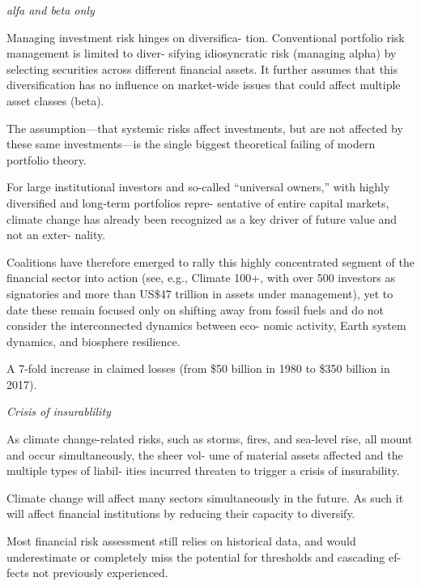\documentclass[
]{book}
\begin{document}
\emph{alfa and beta only}

Managing investment risk hinges on diversifica-
tion. Conventional portfolio risk management is limited to diver-
sifying idiosyncratic risk (managing alpha) by selecting securities
across different financial assets. It further assumes that this
diversification has no influence on market-wide issues that could
affect multiple asset classes (beta).

The assumption---that systemic risks affect
investments, but are not affected by these same investments---is
the single biggest theoretical failing of modern portfolio theory.

For large institutional investors and so-called ``universal
owners,'' with highly diversified and long-term portfolios repre-
sentative of entire capital markets, climate change has already
been recognized as a key driver of future value and not an exter-
nality.

Coalitions have therefore emerged to rally this highly
concentrated segment of the financial sector into action (see,
e.g., Climate 100+, with over 500 investors as signatories and
more than US\$47 trillion in assets under management), yet to
date these remain focused only on shifting away from fossil fuels
and do not consider the interconnected dynamics between eco-
nomic activity, Earth system dynamics, and biosphere resilience.

A 7-fold increase in claimed losses (from \$50 billion in 1980 to \$350 billion in 2017).

\emph{Crisis of insurablility}

As climate change-related risks, such as storms, fires, and
sea-level rise, all mount and occur simultaneously, the sheer vol-
ume of material assets affected and the multiple types of liabil-
ities incurred threaten to trigger a crisis of insurability.

Climate change will affect
many sectors simultaneously in the future. As such it will affect
financial institutions by reducing their capacity to diversify.

Most financial risk assessment
still relies on historical data, and would underestimate or
completely miss the potential for thresholds and cascading ef-
fects not previously experienced.
\end{document}
